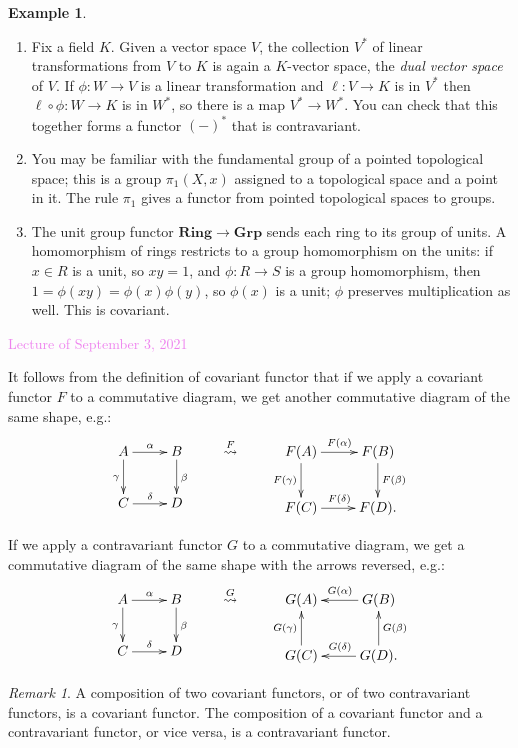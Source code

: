 \documentclass{amsart}[12pt]
\newcommand{\Sept}[1]{\textcolor{violet}{Lecture of September #1, 2021}}
\newcommand{\DEF}[1]{\emph{#1}\index{#1}}
\newcommand{\Def}[1]{#1 \index{#1}}
\numberwithin{equation}{section}
\theoremstyle{plain} %
\theoremstyle{definition}
\newtheorem{ex}[equation]{Example}
\theoremstyle{remark}
\newtheorem{rem}[equation]{Remark}
\newcommand{\Grp}{\mathbf{Grp}}
\newcommand{\Ring}{\mathbf{Ring}}
\begin{document}
\begin{ex}
\begin{enumerate}
\item Fix a field $K$. Given a vector space $V$, the collection \Def{$V^*$} of linear transformations from $V$ to $K$ is again a $K$-vector space, the \DEF{dual vector space} of $V$. If $\phi:W\to V$ is a linear transformation and $\ell:V\to K$ is in $V^*$ then $\ell \circ \phi:W\to K$ is in $W^*$, so there is a map $V^* \to W^*$. You can check that this together forms a functor \Def{$(-)^*$} that is contravariant.
\item You may be familiar with the fundamental group of a pointed topological space; this is a group $\pi_1(X,x)$ assigned to a topological space and a point in it. The rule $\pi_1$ gives a functor from pointed topological spaces to groups.
\item The unit group functor $\Ring\to \Grp$ sends each ring to its group of units. A homomorphism of rings restricts to a group homomorphism on the units: if $x\in R$ is a unit, so $xy=1$, and $\phi:R\to S$ is a group homomorphism, then $1=\phi(xy)=\phi(x) \phi(y)$, so $\phi(x)$ is a unit; $\phi$ preserves multiplication as well. This is covariant.
\end{enumerate}
\end{ex}

\Sept{3}

It follows from the definition of covariant functor that if we apply a covariant functor $F$ to a commutative diagram, we get another commutative diagram of the same shape, e.g.:
\[ 
\xymatrix{
A \ar[r]^{\alpha} \ar[d]_{\gamma}& B \ar[d]^{\beta}\\
C \ar[r]^{\delta} &D } \qquad \stackrel{F}{\rightsquigarrow} \qquad 
\xymatrix{
F(A) \ar[r]^{F(\alpha)} \ar[d]_{F(\gamma)}& F(B) \ar[d]^{F(\beta)}\\
F(C) \ar[r]^{F(\delta)} &F(D).
}
\]



If we apply a contravariant functor $G$ to a commutative diagram, we get a commutative diagram of the same shape with the arrows reversed, e.g.:
\[ 
\xymatrix{
A \ar[r]^{\alpha} \ar[d]_{\gamma}& B \ar[d]^{\beta}\\
C \ar[r]^{\delta} &D } \qquad \stackrel{G}{\rightsquigarrow} \qquad 
\xymatrix{
G(A)  & G(B) \ar[l]_{G(\alpha)} \\
G(C) \ar[u]^{G(\gamma)} &G(D) \ar[u]_{G(\beta)} \ar[l]_{G(\delta)} .
}
\]


\begin{rem} A composition of two covariant functors, or of two contravariant functors, is a covariant functor. The composition of a covariant functor and a contravariant functor, or vice versa, is a contravariant functor.
\end{rem}
\end{document}
